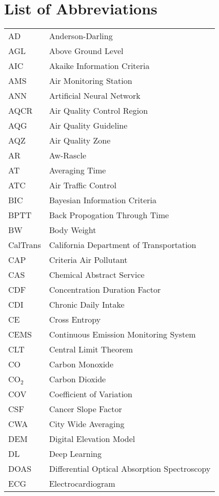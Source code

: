 \chapter*{List of Abbreviations}

\ssp
\small

\begin{longtable}{ll}
AD & Anderson-Darling \\
AGL & Above Ground Level \\
AIC & Akaike Information Criteria \\
AMS & Air Monitoring Station \\
ANN & Artificial Neural Network \\
AQCR & Air Quality Control Region \\
AQG & Air Quality Guideline \\
AQZ & Air Quality Zone \\
AR & Aw-Rascle \\
AT & Averaging Time \\
ATC & Air Traffic Control \\
BIC & Bayesian Information Criteria \\
BPTT & Back Propogation Through Time \\
BW & Body Weight \\
CalTrans & California Department of Transportation \\
CAP & Criteria Air Pollutant \\
CAS & Chemical Abstract Service \\
CDF & Concentration Duration Factor \\
CDI & Chronic Daily Intake \\
CE & Cross Entropy \\
CEMS & Continuous Emission Monitoring System \\
CLT & Central Limit Theorem \\
CO & Carbon Monoxide \\
CO$_{2}$ & Carbon Dioxide \\
COV & Coefficient of Variation \\
CSF & Cancer Slope Factor \\
CWA & City Wide Averaging \\
DEM & Digital Elevation Model \\
DL & Deep Learning \\
DOAS & Differential Optical Absorption Spectroscopy \\
ECG & Electrocardiogram \\

\end{longtable}
